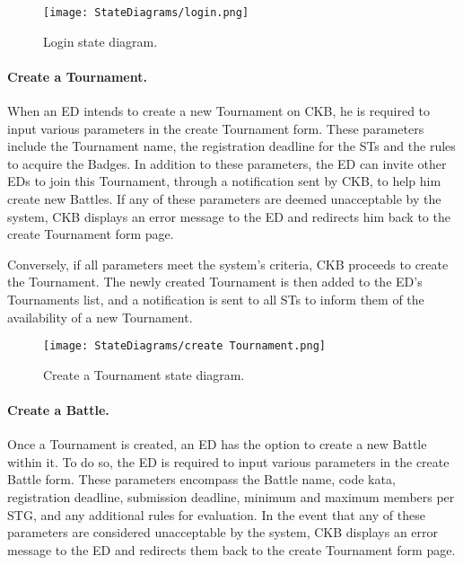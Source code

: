 \begin{figure}[H]
    \begin{center}
        \texttt{[image: StateDiagrams/login.png]}
        \caption{Login state diagram.}
        \label{fig:login_sd}%
    \end{center}
\end{figure}

\newpage

\paragraph{Create a Tournament.}
When an ED intends to create a new Tournament on CKB, he is required to input various parameters in the create Tournament form. These parameters include the Tournament name, the registration deadline for the STs and the rules to acquire the Badges. In addition to these parameters, the ED can invite other EDs to join this Tournament, through a notification sent by CKB, to help him create new Battles. If any of these parameters are deemed unacceptable by the system, CKB displays an error message to the ED and redirects him back to the create Tournament form page.

Conversely, if all parameters meet the system's criteria, CKB proceeds to create the Tournament. The newly created Tournament is then added to the ED's Tournaments list, and a notification is sent to all STs to inform them of the availability of a new Tournament.

\begin{figure}[H]
    \begin{center}
        \texttt{[image: StateDiagrams/create Tournament.png]}
        \caption{Create a Tournament state diagram.}
        \label{fig:create_Tournament_sd}%
    \end{center}
\end{figure}

\paragraph{Create a Battle.}
Once a Tournament is created, an ED has the option to create a new Battle within it. To do so, the ED is required to input various parameters in the create Battle form. These parameters encompass the Battle name, code kata, registration deadline, submission deadline, minimum and maximum members per STG, and any additional rules for evaluation. In the event that any of these parameters are considered unacceptable by the system, CKB displays an error message to the ED and redirects them back to the create Tournament form page.

